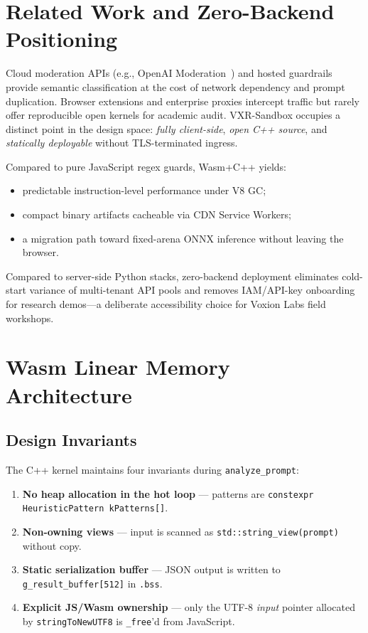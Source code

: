 \documentclass[conference]{IEEEtran}
\begin{document}
\section{Related Work and Zero-Backend Positioning}
\label{sec:related}

Cloud moderation APIs (e.g., OpenAI Moderation~\cite{openai2024}) and hosted guardrails provide semantic classification at the cost of network dependency and prompt duplication. Browser extensions and enterprise proxies intercept traffic but rarely offer reproducible open kernels for academic audit. VXR-Sandbox occupies a distinct point in the design space: \emph{fully client-side}, \emph{open C++ source}, and \emph{statically deployable} without TLS-terminated ingress.

Compared to pure JavaScript regex guards, Wasm+C++ yields:
\begin{itemize}
    \item predictable instruction-level performance under V8 GC;
    \item compact binary artifacts cacheable via CDN Service Workers;
    \item a migration path toward fixed-arena ONNX inference without leaving the browser.
\end{itemize}

Compared to server-side Python stacks, zero-backend deployment eliminates cold-start variance of multi-tenant API pools and removes IAM/API-key onboarding for research demos---a deliberate accessibility choice for Voxion Labs field workshops.

\section{Wasm Linear Memory Architecture}
\label{sec:arch}

\subsection{Design Invariants}

The C++ kernel maintains four invariants during \texttt{analyze\_prompt}:

\begin{enumerate}
    \item[I1.] \textbf{No heap allocation in the hot loop} --- patterns are \texttt{constexpr HeuristicPattern kPatterns[]}.
    \item[I2.] \textbf{Non-owning views} --- input is scanned as \texttt{std::string\_view(prompt)} without copy.
    \item[I3.] \textbf{Static serialization buffer} --- JSON output is written to \texttt{g\_result\_buffer[512]} in \texttt{.bss}.
    \item[I4.] \textbf{Explicit JS/Wasm ownership} --- only the UTF-8 \emph{input} pointer allocated by \texttt{stringToNewUTF8} is \texttt{\_free}'d from JavaScript.
\end{enumerate}
\end{document}
